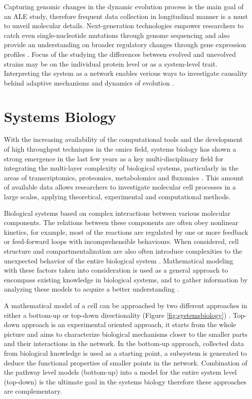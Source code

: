 Capturing genomic changes in the dynamic evolution process is the main goal of an ALE study, therefore frequent data collection in longitudinal manner is a must to unveil molecular details. Next-generation technologies empower researchers to catch even single-nucleotide mutations through genome sequencing and also provide an understanding on broader regulatory changes through gene expression profiles \cite{conrad2011microbial}. Focus of the studying the differences between evolved and unevolved strains may be on the individual protein level or as a system-level trait. Interpreting the system as a network enables verious ways to investigate causality behind adaptive mechanisms and dynamics of evolution \cite{soyer2013evolutionary, long2018adaptive}.

\section{Systems Biology}
With the increasing availability of the computational tools and the development of high throughput techniques in the omics field, systems biology has shown a strong emergence in the last few years as a key multi-disciplinary field for integrating the multi-layer complexity of biological systems, particularly in the areas of transcriptomics, proteomics, metabolomics and fluxomics \cite{kitano2002systems}. This amount of available data allows researchers to investigate molecular cell processes in a large scales, applying theoretical, experimental and computational methods.

Biological systems based on complex interactions between various molecular components. The relations between these components are often obey nonlinear kinetics, for example, most of the reactions are regulated by one or more feedback or feed-forward loops with incomprehensible behaviours. When considered, cell structure and compartmentalization are also often introduce complexities to the unexpected behavior of the entire biological system \cite{bellouquid2006mathematical}. Mathematical modeling with these factors taken into consideration is used as a general approach to encompass existing knowledge in biological systems, and to gather information by analyzing these models to acquire a better understanding \cite{kremling2013systems}.

A mathematical model of a cell can be approached by two different approaches in either a bottom-up or top-down directionality (Figure \ref{fig:systemsbiology}) \cite{bruggeman2007nature, shahzad2012application}. Top-down approach is an experimental oriented approach, it starts from the whole picture and aims to characterize biological mechanisms closer to the smaller parts and their interactions in the network. In the bottom-up approach, collected data from biological knowledge is used as a starting point, a subsystem is generated to deduce the functional properties of smaller points in the network. Combination of the pathway level models (bottom-up) into a model for the entire system level (top-down) is the ultimate goal in the systems biology therefore these approaches are complementary.

